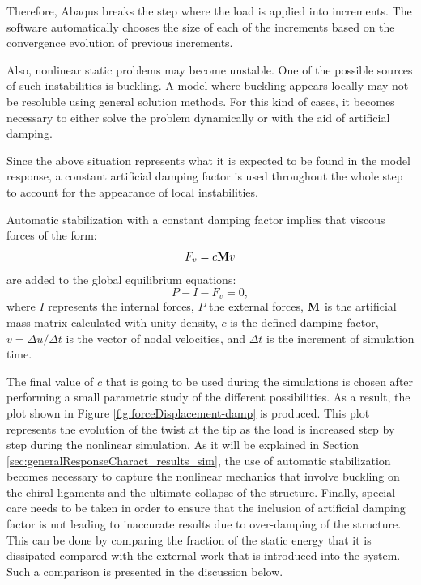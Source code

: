     Therefore, Abaqus breaks the step where the load is applied into increments. The software automatically chooses the size of each of the increments based on the convergence evolution of previous increments.

    Also, nonlinear static problems may become unstable. One of the possible sources of such instabilities is buckling. A model where buckling appears locally may not be resoluble using general solution methods. For this kind of cases, it becomes necessary to either solve the problem dynamically or with the aid of artificial damping.

    Since the above situation represents what it is expected to be found in the model response, a constant artificial damping factor is used throughout the whole step to account for the appearance of local instabilities.

    \noindent
    Automatic stabilization with a constant damping factor implies that viscous forces of the form:
    \begin{equation}
      F_v = c \mathrm{\textbf{M}} v
    \end{equation}
    are added to the global equilibrium equations:
    \begin{equation}
      P - I - F_v = 0,
    \end{equation}
    where $I$ represents the internal forces, $P$ the external forces, $\mathrm{\textbf{M}}$ is the artificial mass matrix calculated with unity density, $c$ is the defined damping factor, $v = \Delta u / \Delta t$ is the vector of nodal velocities, and $\Delta t$ is the increment of simulation time.

    The final value of $c$ that is going to be used during the simulations is chosen after performing a small parametric study of the different possibilities. As a result, the plot shown in Figure \ref{fig:forceDisplacement-damp} is produced. This plot represents the evolution of the twist at the tip as the load is increased step by step during the nonlinear simulation. As it will be explained in Section \ref{sec:generalResponseCharact_results_sim}, the use of automatic stabilization becomes necessary to capture the nonlinear mechanics that involve buckling on the chiral ligaments and the ultimate collapse of the structure. Finally, special care needs to be taken in order to ensure that the inclusion of artificial damping factor is not leading to inaccurate results due to over-damping of the structure. This can be done by comparing the fraction of the static energy that it is dissipated compared with the external work that is introduced into the system. Such a comparison is presented in the discussion below.

